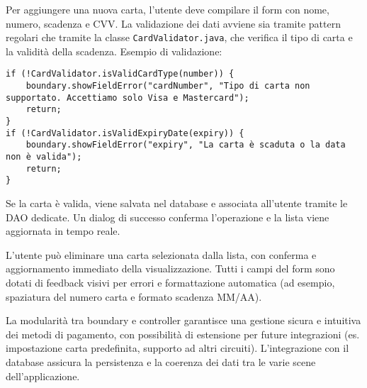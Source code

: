 Per aggiungere una nuova carta, l'utente deve compilare il form con nome, numero, scadenza e CVV. La validazione dei dati avviene sia tramite pattern regolari che tramite la classe \texttt{CardValidator.java}, che verifica il tipo di carta e la validità della scadenza. Esempio di validazione:
\begin{verbatim}
if (!CardValidator.isValidCardType(number)) {
    boundary.showFieldError("cardNumber", "Tipo di carta non supportato. Accettiamo solo Visa e Mastercard");
    return;
}
if (!CardValidator.isValidExpiryDate(expiry)) {
    boundary.showFieldError("expiry", "La carta è scaduta o la data non è valida");
    return;
}
\end{verbatim}
Se la carta è valida, viene salvata nel database e associata all'utente tramite le DAO dedicate. Un dialog di successo conferma l'operazione e la lista viene aggiornata in tempo reale.

L'utente può eliminare una carta selezionata dalla lista, con conferma e aggiornamento immediato della visualizzazione. Tutti i campi del form sono dotati di feedback visivi per errori e formattazione automatica (ad esempio, spaziatura del numero carta e formato scadenza MM/AA).

La modularità tra boundary e controller garantisce una gestione sicura e intuitiva dei metodi di pagamento, con possibilità di estensione per future integrazioni (es. impostazione carta predefinita, supporto ad altri circuiti). L'integrazione con il database assicura la persistenza e la coerenza dei dati tra le varie scene dell'applicazione.

